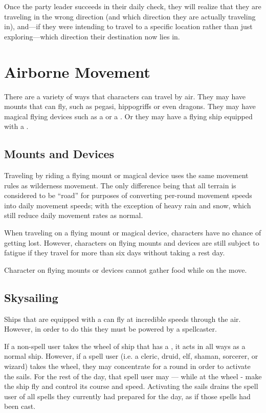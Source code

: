 \begin{multicols*}{2}
Once the party leader succeeds in their daily  check, they will realize that they are traveling in the wrong direction (and which direction they are actually traveling in), and—if they were intending to travel to a specific location rather than just exploring—which direction their destination now lies in.

\section{Airborne Movement}
There are a variety of ways that characters can travel by air. They may have mounts that can fly, such as pegasi, hippogriffs or even dragons. They may have magical flying devices such as a  or a . Or they may have a flying ship equipped with a .

\subsection{Mounts and Devices}
Traveling by riding a flying mount or magical device uses the same movement rules as wilderness movement. The only difference being that all terrain is considered to be “road” for purposes of converting per-round movement speeds into daily movement speeds; with the exception of heavy rain and snow, which still reduce daily movement rates as normal.

When traveling on a flying mount or magical device, characters have no chance of getting lost. However, characters on flying mounts and devices are still subject to fatigue if they travel for more than six days without taking a rest day.

Character on flying mounts or devices cannot gather food while on the move.

\subsection{Skysailing}\label{sec:Skysailing}
Ships that are equipped with a  can fly at incredible speeds through the air. However, in order to do this they must be powered by a spellcaster.

If a non-spell user takes the wheel of ship that has a , it acts in all ways as a normal ship. However, if a spell user (i.e. a cleric, druid, elf, shaman, sorcerer, or wizard) takes the wheel, they may concentrate for a round in order to activate the sails. For the rest of the day, that spell user may — while at the wheel - make the ship fly and control its course and speed. Activating the sails drains the spell user of all spells they currently had prepared for the day, as if those spells had been cast.


\end{multicols*}
